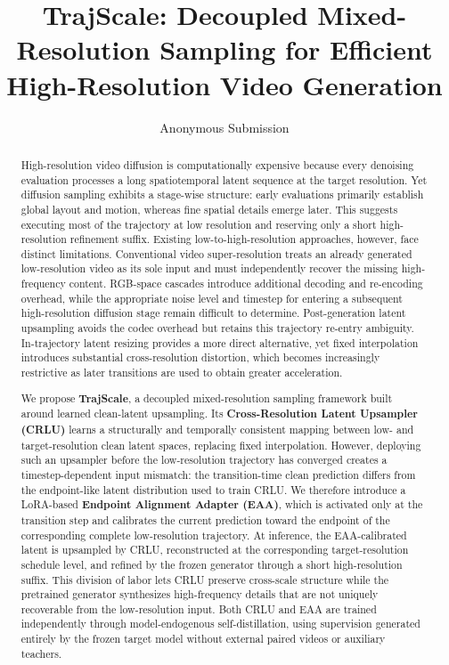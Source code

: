 \documentclass[letterpaper]{article} %
\title{TrajScale: Decoupled Mixed-Resolution Sampling for Efficient High-Resolution Video Generation}
\author{Anonymous Submission}
\begin{document}
\maketitle

\begin{abstract}
High-resolution video diffusion is computationally expensive because every denoising evaluation processes a
 long spatiotemporal latent sequence at the target resolution. Yet diffusion sampling exhibits a stage-wise structure: 
 early evaluations primarily establish global layout and motion, whereas fine spatial details emerge later. 
 This suggests executing most of the trajectory at low resolution and reserving only a short 
 high-resolution refinement suffix. Existing low-to-high-resolution approaches, however, face distinct limitations. 
 Conventional video super-resolution treats an already generated low-resolution video as its sole input and must 
 independently recover the missing high-frequency content. RGB-space cascades introduce additional decoding and 
 re-encoding overhead, while the appropriate noise level and timestep for entering a subsequent high-resolution diffusion 
 stage remain difficult to determine. Post-generation latent upsampling avoids the codec overhead but retains this 
 trajectory re-entry ambiguity. In-trajectory latent resizing provides a more direct alternative, yet fixed interpolation 
 introduces substantial cross-resolution distortion, which becomes increasingly restrictive as later transitions are used 
 to obtain greater acceleration.
 
We propose \textbf{TrajScale}, a decoupled mixed-resolution sampling framework built around learned clean-latent upsampling. Its \textbf{Cross-Resolution Latent Upsampler (CRLU)} learns a structurally and temporally consistent mapping between low- and target-resolution clean latent spaces, replacing fixed interpolation. However, deploying such an upsampler before the low-resolution trajectory has converged creates a timestep-dependent input mismatch: the transition-time clean prediction differs from the endpoint-like latent distribution used to train CRLU. We therefore introduce a LoRA-based \textbf{Endpoint Alignment Adapter (EAA)}, which is activated only at the transition step and calibrates the current prediction toward the endpoint of the corresponding complete low-resolution trajectory. At inference, the EAA-calibrated latent is upsampled by CRLU, reconstructed at the corresponding target-resolution schedule level, and refined by the frozen generator through a short high-resolution suffix. This division of labor lets CRLU preserve cross-scale structure while the pretrained generator synthesizes high-frequency details that are not uniquely recoverable from the low-resolution input. Both CRLU and EAA are trained independently through model-endogenous self-distillation, using supervision generated entirely by the frozen target model without external paired videos or auxiliary teachers.


\end{abstract}
\end{document}
